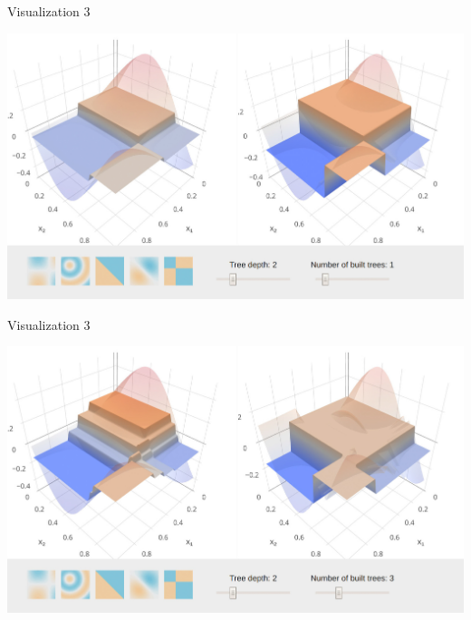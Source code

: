 
\begin{vbframe}{Visualization 3}

\begin{center}
\includegraphics[width=\textwidth]{figure_man/gbm_anim/gbm1.jpg}
\href{http://arogozhnikov.github.io/2016/06/24/gradient_boosting_explained.html}{}
\end{center}
\end{vbframe}



\begin{vbframe}{Visualization 3}

\begin{center}
\includegraphics[width=\textwidth]{figure_man/gbm_anim/gbm3.jpg}
\href{http://arogozhnikov.github.io/2016/06/24/gradient_boosting_explained.html}{}
\end{center}
\addtocounter{framenumber}{-1}

\end{vbframe}

